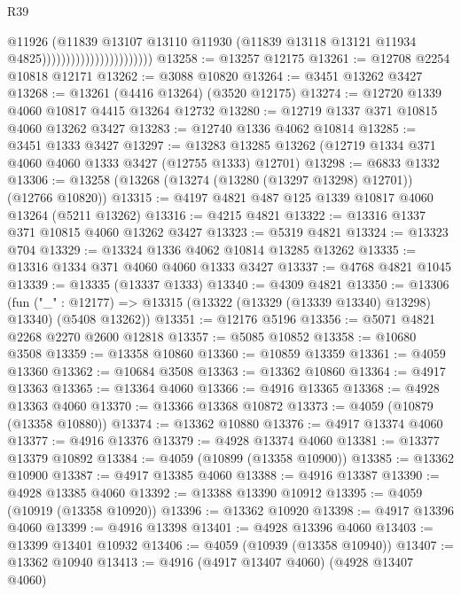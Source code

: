 \begin{lexlean}{R39}
\begin{coremodule}
                                              @11926
                                              (@11839
                                                @13107
                                                @13110
                                                @11930
                                                (@11839
                                                  @13118
                                                  @13121
                                                  @11934
                                                  @4825)))))))))))))))))))))))
@13258 := @13257 @12175
@13261 := @12708 @2254 @10818 @12171
@13262 := @3088 @10820
@13264 := @3451 @13262 @3427
@13268 := @13261 (@4416 @13264) (@3520 @12175)
@13274 := @12720 @1339 @4060 @10817 @4415 @13264 @12732
@13280 := @12719 @1337 @371 @10815 @4060 @13262 @3427
@13283 := @12740 @1336 @4062 @10814
@13285 := @3451 @1333 @3427
@13297 := @13283 @13285 @13262 (@12719 @1334 @371 @4060 @4060 @1333 @3427 (@12755 @1333) @12701)
@13298 := @6833 @1332
@13306 := @13258 (@13268 (@13274 (@13280 (@13297 @13298) @12701)) (@12766 @10820))
@13315 := @4197 @4821 @487 @125 @1339 @10817 @4060 @13264 (@5211 @13262)
@13316 := @4215 @4821
@13322 := @13316 @1337 @371 @10815 @4060 @13262 @3427
@13323 := @5319 @4821
@13324 := @13323 @704
@13329 := @13324 @1336 @4062 @10814 @13285 @13262
@13335 := @13316 @1334 @371 @4060 @4060 @1333 @3427
@13337 := @4768 @4821 @1045
@13339 := @13335 (@13337 @1333)
@13340 := @4309 @4821
@13350 := @13306
    (fun ("_" : @12177) => @13315 (@13322 (@13329 (@13339 @13340) @13298) @13340) (@5408 @13262))
@13351 := @12176 @5196
@13356 := @5071 @4821 @2268 @2270 @2600 @12818
@13357 := @5085 @10852
@13358 := @10680 @3508
@13359 := @13358 @10860
@13360 := @10859 @13359
@13361 := @4059 @13360
@13362 := @10684 @3508
@13363 := @13362 @10860
@13364 := @4917 @13363
@13365 := @13364 @4060
@13366 := @4916 @13365
@13368 := @4928 @13363 @4060
@13370 := @13366 @13368 @10872
@13373 := @4059 (@10879 (@13358 @10880))
@13374 := @13362 @10880
@13376 := @4917 @13374 @4060
@13377 := @4916 @13376
@13379 := @4928 @13374 @4060
@13381 := @13377 @13379 @10892
@13384 := @4059 (@10899 (@13358 @10900))
@13385 := @13362 @10900
@13387 := @4917 @13385 @4060
@13388 := @4916 @13387
@13390 := @4928 @13385 @4060
@13392 := @13388 @13390 @10912
@13395 := @4059 (@10919 (@13358 @10920))
@13396 := @13362 @10920
@13398 := @4917 @13396 @4060
@13399 := @4916 @13398
@13401 := @4928 @13396 @4060
@13403 := @13399 @13401 @10932
@13406 := @4059 (@10939 (@13358 @10940))
@13407 := @13362 @10940
@13413 := @4916 (@4917 @13407 @4060) (@4928 @13407 @4060)

\end{coremodule}
\end{lexlean}
